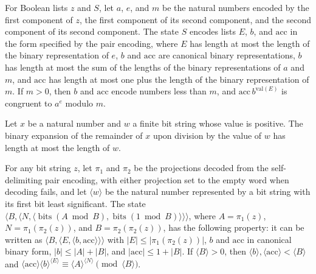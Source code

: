 \begin{definition}
\label{Complexity.BinArith.PowInv}
\leanok
{}
For Boolean lists $z$ and $S$, let $a$, $e$, and $m$ be the natural numbers encoded by
the first component of $z$, the first component of its second component, and the second
component of its second component. The state $S$ encodes lists $E$, $b$, and
$\mathrm{acc}$ in the form specified by the pair encoding, where $E$ has length at most
the length of the binary representation of $e$, $b$ and $\mathrm{acc}$ are canonical
binary representations, $b$ has length at most the sum of the lengths of the binary
representations of $a$ and $m$, and $\mathrm{acc}$ has length at most one plus the
length of the binary representation of $m$. If $m>0$, then $b$ and $\mathrm{acc}$ encode
numbers less than $m$, and $\mathrm{acc}\,b^{\mathrm{val}(E)}$ is congruent to $a^e$
modulo $m$.
\end{definition}

\begin{theorem}
\label{Complexity.BinArith.length_bits_mod_le}
\leanok
{}
Let $x$ be a natural number and $w$ a finite bit string whose value is positive. The
binary expansion of the remainder of $x$ upon division by the value of $w$ has length at
most the length of $w$.
\end{theorem}

\begin{theorem}
\label{Complexity.BinArith.powInv_init}
\leanok
{}
For any bit string $z$, let $\pi_1$ and $\pi_2$ be the projections decoded from the
self-delimiting pair encoding, with either projection set to the empty word when
decoding fails, and let $\langle w\rangle$ be the natural number represented by a bit
string with its first bit least significant. The state $\langle B,\langle N,\langle
\operatorname{bits}(A\bmod B),\operatorname{bits}(1\bmod B)\rangle\rangle\rangle$, where
$A=\pi_1(z)$, $N=\pi_1(\pi_2(z))$, and $B=\pi_2(\pi_2(z))$, has the following property:
it can be written as $\langle B,\langle E,\langle b,\mathrm{acc}\rangle\rangle\rangle$
with $|E|\leq |\pi_1(\pi_2(z))|$, $b$ and $\mathrm{acc}$ in canonical binary form,
$|b|\leq |A|+|B|$, and $|\mathrm{acc}|\leq 1+|B|$. If $\langle B\rangle>0$, then
$\langle b\rangle,\langle\mathrm{acc}\rangle<\langle B\rangle$ and
$\langle\mathrm{acc}\rangle\langle b\rangle^{\langle E\rangle}\equiv \langle
A\rangle^{\langle N\rangle}\pmod{\langle B\rangle}$.
\end{theorem}

